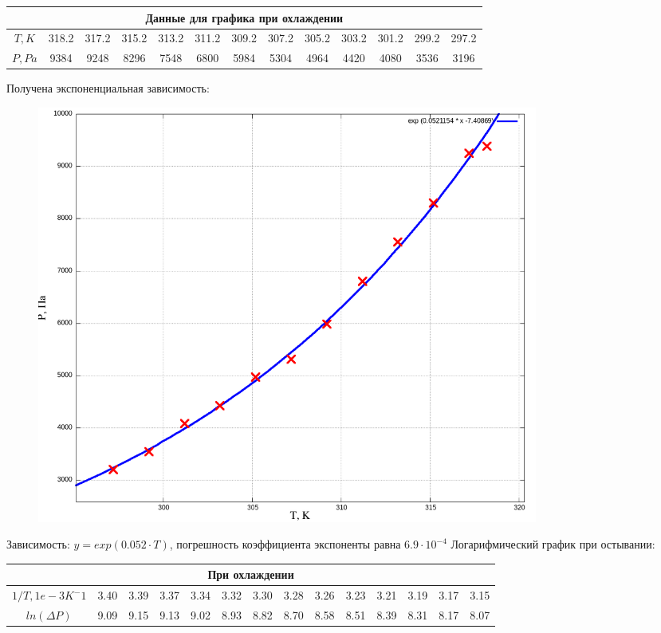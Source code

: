 \documentclass[a4paper,10pt]{article} %
\begin{document}
\begin{center}
\begin{tabular}{|c|c|c|c|c|c|c|c|c|c|c|c|c|}
\hline
\multicolumn{13}{|c|}{Данные для графика при охлаждении}\\
\hline
$T, K$&318.2&317.2&315.2&313.2&311.2&309.2&307.2&305.2&303.2&301.2&299.2&297.2\\\hline
$P, Pa$&9384&9248&8296&7548&6800&5984&5304&4964&4420&4080&3536&3196\\\hline
\end{tabular}
\end{center}

Получена экспоненциальная зависимость: 

\begin{figure}[H]
	\centering
	\includegraphics[width=0.8\textwidth]{2-4-1-3-res.png}
\end{figure}

Зависимость: $y = exp(0.052\cdot T)$, погрешность коэффициента экспоненты равна $6.9\cdot 10^{-4}$
Логарифмический график при остывании:

\begin{tabular}{|c|c|c|c|c|c|c|c|c|c|c|c|c|c|}
\hline
\multicolumn{14}{|c|}{При охлаждении}\\
\hline
$1/T, 1e-3 K^-1$&3.40&3.39&3.37&3.34&3.32&3.30&3.28&3.26&3.23&3.21&3.19&3.17&3.15\\\hline
$ln(\Delta P)$&9.09&9.15&9.13&9.02&8.93&8.82&8.70&8.58&8.51&8.39&8.31&8.17&8.07\\\hline
\end{tabular}
\end{document}
